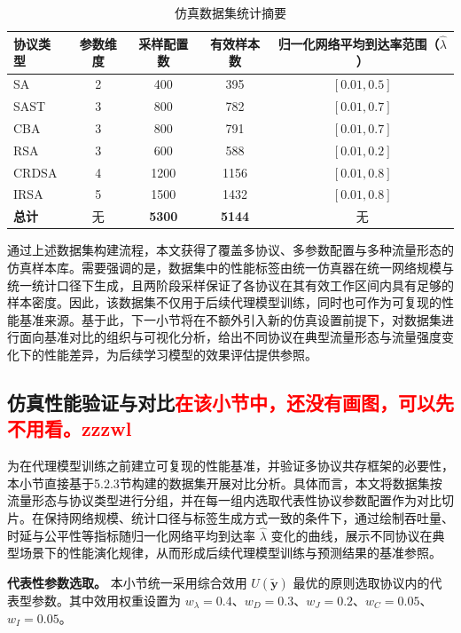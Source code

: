 \begin{table}[htbp]
	\centering
	\caption{仿真数据集统计摘要}
	\label{tab:dataset_summary}
	\renewcommand{\arraystretch}{1.2}
	\begin{tabular}{lcccc}
	\toprule
		\textbf{协议类型} & \textbf{参数维度} & \textbf{采样配置数} & \textbf{有效样本数} & \textbf{归一化网络平均到达率范围（$\hat{\lambda}$）} \\
	\midrule
		SA & 2 & 400 & 395 & $[0.01, 0.5]$ \\
		SAST & 3 & 800 & 782 & $[0.01, 0.7]$ \\
		CBA & 3 & 800 & 791 & $[0.01, 0.7]$ \\
		RSA & 3 & 600 & 588 & $[0.01, 0.2]$ \\
		CRDSA & 4 & 1200 & 1156 & $[0.01, 0.8]$ \\
		IRSA & 5 & 1500 & 1432 & $[0.01, 0.8]$ \\
	\midrule
		\textbf{总计} & 无 & \textbf{5300} & \textbf{5144} & 无 \\
	\bottomrule
	\end{tabular}
\end{table}

通过上述数据集构建流程，本文获得了覆盖多协议、多参数配置与多种流量形态的仿真样本库。需要强调的是，数据集中的性能标签由统一仿真器在统一网络规模与统一统计口径下生成，且两阶段采样保证了各协议在其有效工作区间内具有足够的样本密度。因此，该数据集不仅用于后续代理模型训练，同时也可作为可复现的性能基准来源。基于此，下一小节将在不额外引入新的仿真设置前提下，对数据集进行面向基准对比的组织与可视化分析，给出不同协议在典型流量形态与流量强度变化下的性能差异，为后续学习模型的效果评估提供参照。


\subsection{仿真性能验证与对比\textcolor{red}{在该小节中，还没有画图，可以先不用看。zzzwl}}
\label{subsec:protocol_performance_comparison}

为在代理模型训练之前建立可复现的性能基准，并验证多协议共存框架的必要性，本小节直接基于5.2.3节构建的数据集开展对比分析。具体而言，本文将数据集按流量形态与协议类型进行分组，并在每一组内选取代表性协议参数配置作为对比切片。在保持网络规模、统计口径与标签生成方式一致的条件下，通过绘制吞吐量、时延与公平性等指标随归一化网络平均到达率 $\hat{\lambda}$ 变化的曲线，展示不同协议在典型场景下的性能演化规律，从而形成后续代理模型训练与预测结果的基准参照。

\textbf{代表性参数选取。} 本小节统一采用综合效用 $U(\tilde{\mathbf{y}})$ 最优的原则选取协议内的代表型参数。其中效用权重设置为 $w_{\lambda}=0.4$、$w_D=0.3$、$w_J=0.2$、$w_C=0.05$、$w_I=0.05$。


